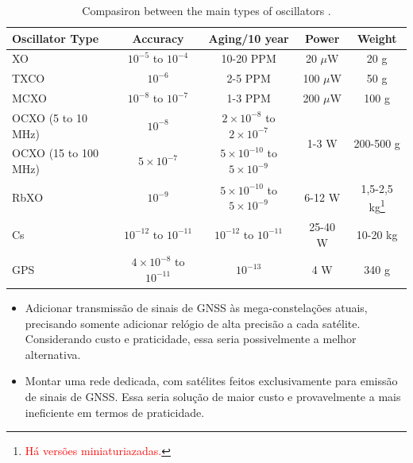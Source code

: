 \begin{table}[!ht]
    \centering
    \begin{tabular}{lcccc}
        \toprule[1.5pt]
        \textbf{Oscillator Type} & \textbf{Accuracy} & \textbf{Aging/10 year} & \textbf{Power} & \textbf{Weight} \\
        \midrule
        XO                   & $10^{-5}$ to $10^{-4}$   & 10-20 PPM                                 & 20 $\mu$W  & 20 g \\
        TXCO                 & $10^{-6}$                & 2-5 PPM                                   & 100 $\mu$W & 50 g \\
        MCXO                 & $10^{-8}$ to $10^{-7}$   & 1-3 PPM                                   & 200 $\mu$W & 100 g \\
        OCXO (5 to 10 MHz)   & $10^{-8}$                & $2 \times 10^{-8}$ to $2 \times 10^{-7}$  & \multirow{2}{*}{1-3 W} & \multirow{2}{*}{200-500 g} \\
        OCXO (15 to 100 MHz) & $5 \times 10^{-7}$       & $5 \times 10^{-10}$ to $5 \times 10^{-9}$ &            &  \\
        RbXO                 & $10^{-9}$                & $5 \times 10^{-10}$ to $5 \times 10^{-9}$ & 6-12 W & 1,5-2,5 kg\footnote{\textcolor{red}{Há versões miniaturiazadas.}} \\
        Cs                   & $10^{-12}$ to $10^{-11}$ & $10^{-12}$ to $10^{-11}$                  & 25-40 W & 10-20 kg \\
        GPS                  & $4 \times 10^{-8}$ to $10^{-11}$ & $10^{-13}$ & 4 W & 340 g \\
        \bottomrule[1.5pt]
    \end{tabular}
    \caption{Compasiron between the main types of oscillators \cite{mancini2004}.}
    \label{tab:osc-comp}
\end{table}

\begin{itemize}
    \item Adicionar transmissão de sinais de GNSS às mega-constelações atuais, precisando somente adicionar relógio de alta precisão a cada satélite. Considerando custo e praticidade, essa seria possivelmente a melhor alternativa.
    \item Montar uma rede dedicada, com satélites feitos exclusivamente para emissão de sinais de GNSS. Essa seria solução de maior custo e provavelmente a mais ineficiente em termos de praticidade.
\end{itemize}

